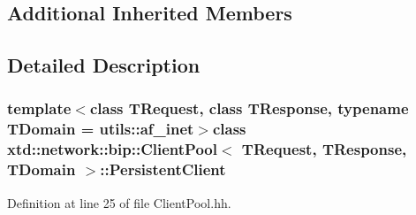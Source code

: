 \subsection*{Additional Inherited Members}


\subsection{Detailed Description}
\subsubsection*{template$<$class T\-Request, class T\-Response, typename T\-Domain = utils\-::af\-\_\-inet$>$class xtd\-::network\-::bip\-::\-Client\-Pool$<$ T\-Request, T\-Response, T\-Domain $>$\-::\-Persistent\-Client}



Definition at line 25 of file Client\-Pool.\-hh.



